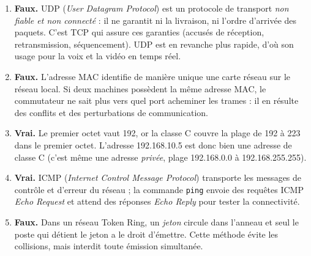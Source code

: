 \documentclass[11pt]{article}
\newcommand{\cle}[1]{{\popxbold\color{popdark}#1}}
\begin{document}
\begin{corrige}
\begin{enumerate}
\item \textbf{Faux.} \cle{UDP} (\emph{User Datagram Protocol}) est un protocole de transport \emph{non fiable et non connecté} : il ne garantit ni la livraison, ni l'ordre d'arrivée des paquets. C'est \cle{TCP} qui assure ces garanties (accusés de réception, retransmission, séquencement). \cle{UDP} est en revanche plus rapide, d'où son usage pour la voix et la vidéo en temps réel.
\item \textbf{Faux.} L'adresse \cle{MAC} identifie de manière unique une carte réseau sur le réseau local. Si deux machines possèdent la même adresse \cle{MAC}, le commutateur ne sait plus vers quel port acheminer les trames : il en résulte des conflits et des perturbations de communication.
\item \textbf{Vrai.} Le premier octet vaut 192, or la classe C couvre la plage de 192 à 223 dans le premier octet. L'adresse 192.168.10.5 est donc bien une adresse de classe C (c'est même une adresse \emph{privée}, plage 192.168.0.0 à 192.168.255.255).
\item \textbf{Vrai.} \cle{ICMP} (\emph{Internet Control Message Protocol}) transporte les messages de contrôle et d'erreur du réseau ; la commande \texttt{ping} envoie des requêtes \cle{ICMP} \emph{Echo Request} et attend des réponses \emph{Echo Reply} pour tester la connectivité.
\item \textbf{Faux.} Dans un réseau \cle{Token Ring}, un \emph{jeton} circule dans l'anneau et seul le poste qui détient le jeton a le droit d'émettre. Cette méthode évite les collisions, mais interdit toute émission simultanée.
\end{enumerate}
\end{corrige}
\end{document}

